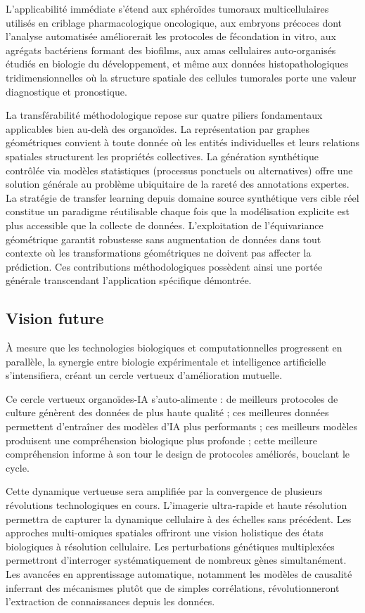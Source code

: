 L'applicabilité immédiate s'étend aux sphéroïdes tumoraux multicellulaires~\cite{Boj2015} utilisés en criblage pharmacologique oncologique, aux embryons précoces dont l'analyse automatisée améliorerait les protocoles de fécondation in vitro, aux agrégats bactériens formant des biofilms, aux amas cellulaires auto-organisés étudiés en biologie du développement, et même aux données histopathologiques tridimensionnelles où la structure spatiale des cellules tumorales porte une valeur diagnostique et pronostique.

La transférabilité méthodologique repose sur quatre piliers fondamentaux applicables bien au-delà des organoïdes. La représentation par graphes géométriques convient à toute donnée où les entités individuelles et leurs relations spatiales structurent les propriétés collectives. La génération synthétique contrôlée via modèles statistiques (processus ponctuels ou alternatives) offre une solution générale au problème ubiquitaire de la rareté des annotations expertes. La stratégie de transfer learning depuis domaine source synthétique vers cible réel constitue un paradigme réutilisable chaque fois que la modélisation explicite est plus accessible que la collecte de données. L'exploitation de l'équivariance géométrique garantit robustesse sans augmentation de données dans tout contexte où les transformations géométriques ne doivent pas affecter la prédiction. Ces contributions méthodologiques possèdent ainsi une portée générale transcendant l'application spécifique démontrée.

\subsection{Vision future}

À mesure que les technologies biologiques et computationnelles progressent en parallèle, la synergie entre biologie expérimentale et intelligence artificielle s'intensifiera, créant un cercle vertueux d'amélioration mutuelle.

Ce cercle vertueux organoïdes-IA s'auto-alimente : de meilleurs protocoles de culture génèrent des données de plus haute qualité ; ces meilleures données permettent d'entraîner des modèles d'IA plus performants ; ces meilleurs modèles produisent une compréhension biologique plus profonde ; cette meilleure compréhension informe à son tour le design de protocoles améliorés, bouclant le cycle.

Cette dynamique vertueuse sera amplifiée par la convergence de plusieurs révolutions technologiques en cours. L'imagerie ultra-rapide et haute résolution permettra de capturer la dynamique cellulaire à des échelles sans précédent. Les approches multi-omiques spatiales offriront une vision holistique des états biologiques à résolution cellulaire. Les perturbations génétiques multiplexées permettront d'interroger systématiquement de nombreux gènes simultanément. Les avancées en apprentissage automatique, notamment les modèles de causalité inferrant des mécanismes plutôt que de simples corrélations, révolutionneront l'extraction de connaissances depuis les données.

